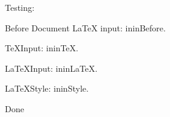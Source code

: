 \documentclass{article}
\begin{document}
Testing:
\par\noindent
Before Document LaTeX input: \csname ininBefore\endcsname.
\par\noindent
TeXInput: \csname ininTeX\endcsname.
\par\noindent
LaTeXInput: \csname ininLaTeX\endcsname.
\par\noindent
LaTeXStyle: \csname ininStyle\endcsname.
\par\noindent

Done
\end{document}
